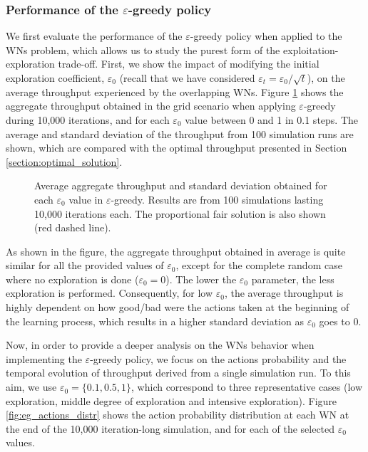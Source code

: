 \documentclass[preprint,12pt]{elsarticle}
\begin{document}
\subsubsection{Performance of the $\varepsilon$-greedy policy}
\label{section:egreedy_study}	
We first evaluate the performance of the $\varepsilon$-greedy policy when applied to the WNs problem, which allows us to study the purest form of the exploitation-exploration trade-off. First, we show the impact of modifying the initial exploration coefficient, $\varepsilon_0$ (recall that we have considered $\varepsilon_t = \varepsilon_0 / \sqrt{t}$), on the average throughput experienced by the overlapping WNs. Figure \ref{fig:egreedy_tuning_parameters} shows the aggregate throughput obtained in the grid scenario when applying $\varepsilon$-greedy during 10,000 iterations, and for each $\varepsilon_0$ value between 0 and 1 in 0.1 steps. The average and standard deviation of the throughput from 100 simulation runs are shown, which are compared with the optimal throughput presented in Section \ref{section:optimal_solution}.
\begin{figure}[t!]
	\centering							
	\caption{Average aggregate throughput and standard deviation obtained for each $\varepsilon_0$ value in $\varepsilon$-greedy. Results are from 100 simulations lasting 10,000 iterations each. The proportional fair solution is also shown (red dashed line).}
	\label{fig:egreedy_tuning_parameters}
\end{figure}		
As shown in the figure, the aggregate throughput obtained in average is quite similar for all the provided values of $\varepsilon_0$, except for the complete random case where no exploration is done ($\varepsilon_0 = 0$). The lower the $\varepsilon_0$ parameter, the less exploration is performed. Consequently, for low $\varepsilon_0$, the average throughput is highly dependent on how good/bad were the actions taken at the beginning of the learning process, which results in a higher standard deviation as $\varepsilon_0$ goes to 0.

Now, in order to provide a deeper analysis on the WNs behavior when implementing the $\varepsilon$-greedy policy, we focus on the actions probability and the temporal evolution of throughput derived from a single simulation run. To this aim, we use $\varepsilon_0 = \{0.1, 0.5, 1\}$, which correspond to three representative cases (low exploration, middle degree of exploration and intensive exploration). Figure \ref{fig:eg_actions_distr} shows the action probability distribution at each WN at the end of the 10,000 iteration-long simulation, and for each of the selected $\varepsilon_0$ values. 
\end{document}

